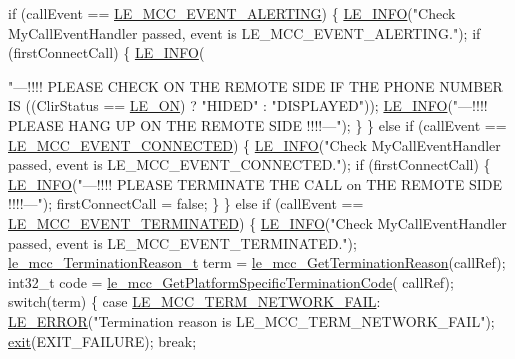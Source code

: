 \begin{DoxyCodeInclude}
{    \textcolor{keywordflow}{if} (callEvent == \hyperlink{le__mcc__interface_8h_aefc4679ffa76d0e04c578572c22f06cfa05261a9fdb7ee59a0dae1cc27bb30e07}{LE\_MCC\_EVENT\_ALERTING})
    \{
        \hyperlink{le__log_8h_a23e6d206faa64f612045d688cdde5808}{LE\_INFO}(\textcolor{stringliteral}{"Check MyCallEventHandler passed, event is LE\_MCC\_EVENT\_ALERTING."});
        \textcolor{keywordflow}{if} (firstConnectCall)
        \{
            \hyperlink{le__log_8h_a23e6d206faa64f612045d688cdde5808}{LE\_INFO}(\textcolor{stringliteral}{"---!!!! PLEASE CHECK ON THE REMOTE SIDE IF THE PHONE NUMBER IS %
                            ((ClirStatus == \hyperlink{le__basics_8h_ae2138c90c41d30e2d510be01d8b374daa73623e8b9450d62517b467b9be2afce8}{LE\_ON}) ? \textcolor{stringliteral}{"HIDED"} : \textcolor{stringliteral}{"DISPLAYED"}));
            \hyperlink{le__log_8h_a23e6d206faa64f612045d688cdde5808}{LE\_INFO}(\textcolor{stringliteral}{"---!!!! PLEASE HANG UP ON THE REMOTE SIDE !!!!---"});
        \}
    \}
    \textcolor{keywordflow}{else} \textcolor{keywordflow}{if} (callEvent == \hyperlink{le__mcc__interface_8h_aefc4679ffa76d0e04c578572c22f06cfa86702531207c50314b10ae3278c7ca0d}{LE\_MCC\_EVENT\_CONNECTED})
    \{
        \hyperlink{le__log_8h_a23e6d206faa64f612045d688cdde5808}{LE\_INFO}(\textcolor{stringliteral}{"Check MyCallEventHandler passed, event is LE\_MCC\_EVENT\_CONNECTED."});
        \textcolor{keywordflow}{if} (firstConnectCall)
        \{
            \hyperlink{le__log_8h_a23e6d206faa64f612045d688cdde5808}{LE\_INFO}(\textcolor{stringliteral}{"---!!!! PLEASE TERMINATE THE CALL on THE REMOTE SIDE !!!!---"});
            firstConnectCall = \textcolor{keyword}{false};
        \}
    \}
    \textcolor{keywordflow}{else} \textcolor{keywordflow}{if} (callEvent == \hyperlink{le__mcc__interface_8h_aefc4679ffa76d0e04c578572c22f06cfa38b7c4ab21fa9828be8169372e41ae98}{LE\_MCC\_EVENT\_TERMINATED})
    \{
        \hyperlink{le__log_8h_a23e6d206faa64f612045d688cdde5808}{LE\_INFO}(\textcolor{stringliteral}{"Check MyCallEventHandler passed, event is LE\_MCC\_EVENT\_TERMINATED."});
        \hyperlink{le__mcc__interface_8h_abda706f723ba619f9bc460bcc9a4960d}{le\_mcc\_TerminationReason\_t} term = 
      \hyperlink{le__mcc__interface_8h_ab16921abc02e0569b129f4a7d92bf3c9}{le\_mcc\_GetTerminationReason}(callRef);
        int32\_t code = \hyperlink{le__mcc__interface_8h_a68b9b8ed1b221924dcea1be0fd610a54}{le\_mcc\_GetPlatformSpecificTerminationCode}(
      callRef);
        \textcolor{keywordflow}{switch}(term)
        \{
            \textcolor{keywordflow}{case} \hyperlink{le__mcc__interface_8h_abda706f723ba619f9bc460bcc9a4960da2ef2a4a77e51faec38a2c131ff5d6f24}{LE\_MCC\_TERM\_NETWORK\_FAIL}:
                \hyperlink{le__log_8h_a353590f91b3143a7ba3a416ae5a50c3d}{LE\_ERROR}(\textcolor{stringliteral}{"Termination reason is LE\_MCC\_TERM\_NETWORK\_FAIL"});
                \hyperlink{app_stop_client_8c_a310220604a584e112ba8f7aa3dfe23f1}{exit}(EXIT\_FAILURE);
                \textcolor{keywordflow}{break};

}}
\end{DoxyCodeInclude}
